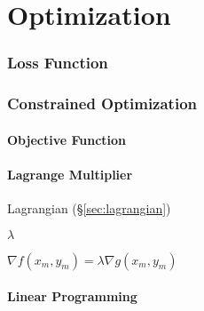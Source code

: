 \part{Optimization}\label{part:optimization}

\section{Loss Function}\label{sec:loss_function}


\section{Constrained Optimization}\label{sec:constrined_optimization}

\subsection{Objective Function}\label{sec:objective_function}

\subsection{Lagrange Multiplier}\label{sec:lagrange_multiplier}

\fist Lagrangian (\S\ref{sec:lagrangian})

$\lambda$

$\nabla f(x_m, y_m) = \lambda\nabla g(x_m, y_m)$



\subsection{Linear Programming}\label{sec:linear_programming}

